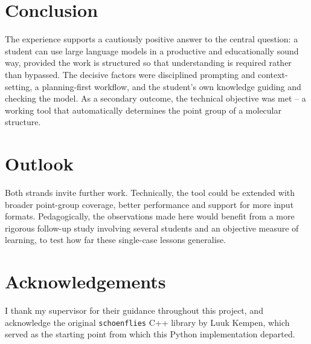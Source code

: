 \documentclass[11pt, a4paper]{article}
\begin{document}
\section{Conclusion}
The experience supports a cautiously positive answer to the central question: a student
can use large language models in a productive and educationally sound way, provided the
work is structured so that understanding is required rather than bypassed. The decisive
factors were disciplined prompting and context-setting, a planning-first workflow, and
the student's own knowledge guiding and checking the model. As a secondary outcome, the
technical objective was met -- a working tool that automatically determines the point
group of a molecular structure.

\section{Outlook}
Both strands invite further work. Technically, the tool could be extended with broader
point-group coverage, better performance and support for more input formats.
Pedagogically, the observations made here would benefit from a more rigorous follow-up
study involving several students and an objective measure of learning, to test how far
these single-case lessons generalise.

\section*{Acknowledgements}
I thank my supervisor for their guidance throughout this project, and acknowledge the
original \texttt{schoenflies} C++ library by Luuk Kempen, which served as the starting
point from which this Python implementation departed.




\newpage
\printbibliography

\appendix
\end{document}
